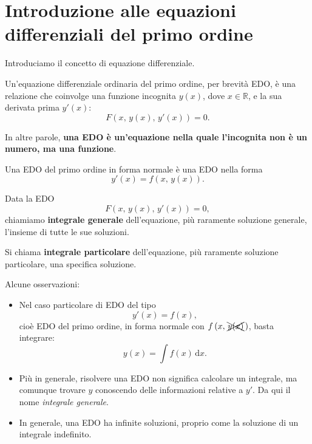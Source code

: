 \documentclass[../../dimostrazioni]{subfiles}
\begin{document}
    \chapter{Introduzione alle equazioni differenziali del primo ordine}

        Introduciamo il concetto di equazione differenziale.

        \begin{definizione}
            Un'equazione differenziale ordinaria del primo ordine, per brevità EDO, è una relazione che coinvolge una funzione incognita
            \(y(x)\), dove \(x \in \mathbb{R}\), e la sua derivata prima \(y'(x)\):
            \[
                F\left(x, \, y(x), \, y'(x)\right) = 0.
            \]

            In altre parole, \textbf{una EDO è un'equazione nella quale l'incognita non è un numero, ma una funzione}.
        \end{definizione}

        \begin{definizione}
            Una EDO del primo ordine in forma normale è una EDO nella forma
            \[
                y'(x) = f\left(x, \, y(x)\right).
            \]
        \end{definizione}

        \begin{definizione}
            Data la EDO
            \[
                F\left(x, \, y(x), \, y'(x)\right) = 0,
            \]
            chiamiamo \textbf{integrale generale} dell'equazione, più raramente soluzione generale, l'insieme di tutte le sue soluzioni.

            Si chiama \textbf{integrale particolare} dell'equazione, più raramente soluzione particolare, una specifica soluzione.
        \end{definizione}

        Alcune osservazioni:
        \begin{itemize}
            \item Nel caso particolare di EDO del tipo
                \[
                    y'(x) = f(x),
                \]
                cioè EDO del primo ordine, in forma normale con \(f\left(x, \, \xcancel{y(x)} \, \right)\), basta integrare:
                \[
                    y(x) = \int \! f(x) \, \mathrm{d}x.
                \]
            \item Più in generale, risolvere una EDO non significa calcolare un integrale, ma comunque trovare \(y\) conoscendo delle
                informazioni relative a \(y'\). Da qui il nome \emph{integrale generale}.
            \item In generale, una EDO ha infinite soluzioni, proprio come la soluzione di un integrale indefinito.
        \end{itemize}
            
\end{document}
